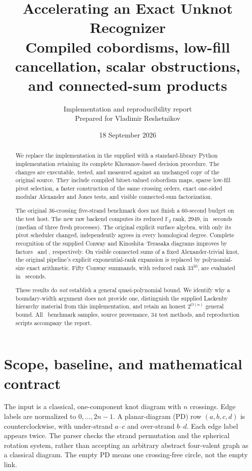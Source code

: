 \documentclass[11pt]{article}
\title{Accelerating an Exact Unknot Recognizer\\[5pt]
\large Compiled cobordisms, low-fill cancellation, scalar obstructions,\\
and connected-sum products}
\author{Implementation and reproducibility report\\
\small Prepared for Vladimir Reshetnikov}
\date{18 September 2026}
\newcommand{\F}{\mathbb F}
\newcommand{\code}[1]{\texttt{\detokenize{#1}}}
\begin{document}
\maketitle
\thispagestyle{empty}
\begin{abstract}
We replace the implementation in the supplied \code{Knots.zip/fast/} with a
standard-library Python implementation retaining its complete Khovanov-based
decision procedure. The changes are executable, tested, and measured against an
unchanged copy of the original source. They include compiled bitset-valued
cobordism maps, sparse low-fill pivot selection, a faster construction of the
same crossing orders, exact one-sided modular Alexander and Jones tests, and
visible connected-sum factorization.

The original 36-crossing five-strand benchmark does not finish a 60-second
budget on the test host. The new raw backend computes its reduced
$\F_2$ rank, $2949$, in \HardNewSeconds\ seconds (median of three fresh
processes). The original explicit surface algebra, with only its pivot scheduler
changed, independently agrees in every homological degree. Complete recognition
of the supplied Conway and Kinoshita--Terasaka diagrams improves by factors
\ConwayRecognitionSpeedup\ and \KTRecognitionSpeedup, respectively. On visible
connected sums of a fixed Alexander-trivial knot, the original pipeline's
explicit exponential-rank expansion is replaced by polynomial-size exact
arithmetic. Fifty Conway summands, with reduced rank $33^{50}$, are evaluated
in \ConwayFiftySeconds\ seconds.

These results do \emph{not} establish a general quasi-polynomial bound.
We identify why a boundary-width argument does not provide one, distinguish
the supplied Lackenby hierarchy material from this implementation, and retain
an honest $2^{O(n)}$ general bound. All \TrialCount\ benchmark samples, source
provenance, 34 test methods, and reproduction scripts accompany the report.
\end{abstract}
\clearpage
\begingroup
\small
\setlength{\parskip}{0pt}
\tableofcontents
\endgroup
\clearpage

\section{Scope, baseline, and mathematical contract}

The input is a classical, one-component knot diagram with $n$ crossings. Edge
labels are normalized to $0,\ldots,2n-1$. A planar-diagram (PD) row
$(a,b,c,d)$ is counterclockwise, with under-strand $a$--$c$ and over-strand
$b$--$d$. Each edge label appears twice. The parser checks the strand
permutation and the spherical rotation system, rather than accepting an
arbitrary abstract four-valent graph as a classical diagram. The empty PD
means one crossing-free circle, not the empty link.
\end{document}
